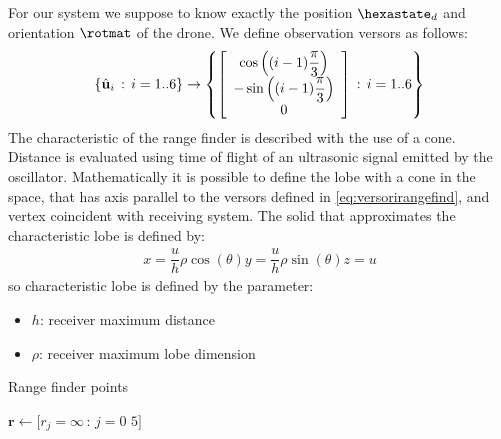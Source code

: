For our system we suppose to know exactly the position $\hexastate_d$ and orientation $\rotmat$ of the drone. We define observation versors as follows:
\begin{equation}
\label{eq:versorirangefind}
\left\{ \hat{\mathbf{u}}_i \,:\, i=1..6 \right\} \rightarrow \left\{ \left[\begin{array}{c}\cos\left( (i-1)\dfrac{\pi}{3} \right) \\ -\sin\left( (i-1)\dfrac{\pi}{3} \right) \\0\end{array}\right] \,:\, i=1..6 \right\}
\end{equation}
The characteristic of the range finder is described with the use of a cone. Distance is evaluated using time of flight of an ultrasonic signal emitted by the oscillator. Mathematically it is possible to define the lobe with a cone in the space, that has axis parallel to the versors defined in \ref{eq:versorirangefind}, and vertex coincident with receiving system. The solid that approximates the characteristic lobe is defined by:
\begin{equation}
\begin{array}{rcl}
x = \dfrac{u}{h} \rho \cos(\theta)
y = \dfrac{u}{h} \rho \sin(\theta)
z = u
\end{array}
\end{equation}
so characteristic lobe is defined by the parameter:
\begin{itemize}
\item $h$: receiver maximum distance
\item $\rho$: receiver maximum lobe dimension
\end{itemize}

\begin{algorithm}[h]
\caption{Range finder points}
$\mathbf{r} \leftarrow [r_j = \infty\,:\,j=0$ \KwTo $5]$\;
\end{algorithm}

